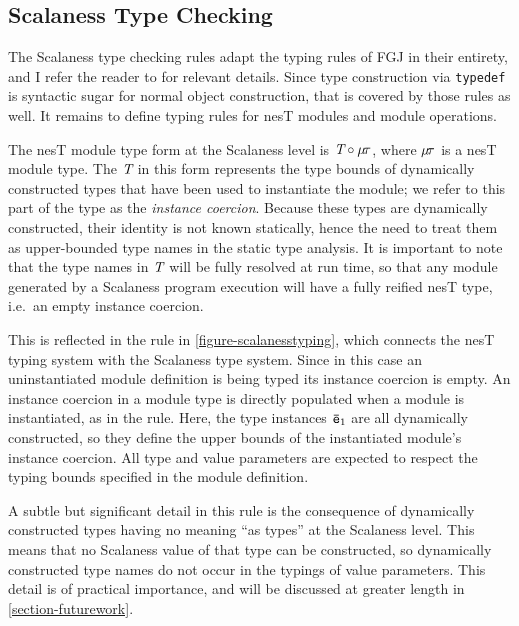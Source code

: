 \subsection{Scalaness Type Checking}
\label{section-typing}

\scalanesstypingfig

The Scalaness type checking rules adapt the typing rules of FGJ in their entirety, and I refer
the reader to \cite{FJ} for relevant details. Since type construction via \texttt{typedef} is
syntactic sugar for normal object construction, that is covered by those rules as well. It
remains to define typing rules for nesT modules and module operations.

The nesT module type form at the Scalaness level is $\textit{T} \circ \mu\!\tau$, where
$\mu\!\tau$ is a nesT module type. The $\textit{T}$ in this form represents the type bounds of
dynamically constructed types that have been used to instantiate the module; we refer to this
part of the type as the \emph{instance coercion}. Because these types are dynamically
constructed, their identity is not known statically, hence the need to treat them as
upper-bounded type names in the static type analysis. It is important to note that the type
names in $\textit{T}$ will be fully resolved at run time, so that any module generated by a
Scalaness program execution will have a fully reified nesT type, i.e.~an empty instance
coercion.

This is reflected in the  rule in \autoref{figure-scalanesstyping}, which connects
the nesT typing system with the Scalaness type system. Since in this case an uninstantiated
module definition is being typed its instance coercion is empty. An instance coercion in a
module type is directly populated when a module is instantiated, as in the 
rule. Here, the type instances ${\mathtt{\bar{e}}}_1$ are all dynamically constructed, so they define the
upper bounds of the instantiated module's instance coercion. All type and value parameters are
expected to respect the typing bounds specified in the module definition.

A subtle but significant detail in this rule is the consequence of dynamically constructed types
having no meaning ``as types'' at the Scalaness level. This means that no Scalaness value of
that type can be constructed, so dynamically constructed type names do not occur in the typings
of value parameters. This detail is of practical importance, and will be discussed at greater
length in \autoref{section-futurework}.

